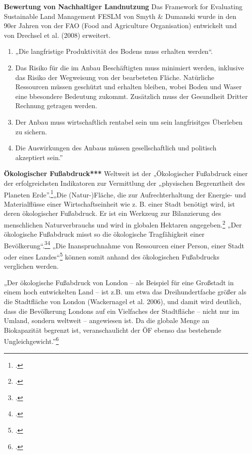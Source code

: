 \documentclass{scrartcl}
\begin{document}
\textbf{Bewertung von Nachhaltiger Landnutzung}
Das Framework for Evaluating Sustainable Land Management FESLM von Smyth \& Dumanski wurde in den 90er Jahren von der FAO (Food and Agriculture Organisation) entwickelt und von Drechsel et al. (2008) erweitert.

\begin{enumerate}
    \item „Die langfristige Produktivität des Bodens muss erhalten werden“.
    \item Das Risiko für die im Anbau Beschäftigten muss minimiert werden, inklusive das Risiko der Wegweisung von der bearbeteten Fläche.
    Natürliche Ressourcen müssen geschützt und erhalten bleiben, wobei Boden und Waser eine bbesondere Bedeutung zukommt. Zusätzlich muss der Gesundheit Dritter Rechnung getragen werden.
    \item Der Anbau muss wirtschaftlich rentabel sein um sein langfrisitges Überleben zu sichern.
    \item Die Auswirkungen des Anbaus müssen gesellschaftlich und politisch akzeptiert sein.”
\end{enumerate}

\textbf{Ökologischer Fußabdruck***}
Weltweit ist der „Ökologischer Fußabdruck einer der erfolgreichsten Indikatoren zur Vermittlung der „physischen Begrenztheit des Planeten Erde”.\footcite[S.2]{StefanGiljum2007WissenschaftlicheFuabdruck}„Die (Natur-)Fläche, die zur Aufrechterhaltung der Energie- und Materialflüsse einer Wirtschaftseinheit wie z. B. einer Stadt benötigt wird, ist deren ökologischer Fußabdruck. Er ist ein Werkzeug zur Bilanzierung des menschlichen Naturverbrauchs und wird in globalen Hektaren angegeben.\footcite[S. 25]{MathisWackernagelUnserNimmt} „Der ökologische Fußabdruck misst so die ökologische Tragfähigkeit einer Bevölkerung“.\footcite[S.5]{MichelsenGrundlagenEntwicklung}\footcite[Vgl.][S.23ff]{MathisWackernagelUnserNimmt}
„Die Inanspruchnahme von Ressourcen einer Person, einer Stadt oder eines Landes“\footcite[S.192]{AntjeFlade2015StadtStadtforschung} können somit anhand des ökologischen Fußabdrucks verglichen werden. 

\begin{displayquote}
„Der ökologische Fußabdruck von London – als Beispiel für eine Großstadt in einem hoch entwickelten Land – ist z.B. um etwa das Dreihundertfache größer als die Stadtfläche von London (Wackernagel et al. 2006), und damit wird deutlich, dass die Bevölkerung Londons auf ein Vielfaches der Stadtfläche – nicht nur im Umland, sondern weltweit – angewiesen ist. Da die globale Menge an Biokapazität begrenzt ist, veranschaulicht der ÖF ebenso das bestehende Ungleichgewicht.”\footcite{AntjeFlade2015StadtStadtforschung, S.192}
\end{displayquote} 
\end{document}
